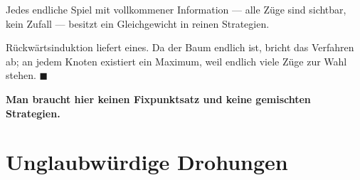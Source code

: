 \begin{merksatz}
Jedes endliche Spiel mit vollkommener Information --- alle Züge sind sichtbar, kein Zufall --- besitzt ein Gleichgewicht in reinen Strategien.

Rückwärtsinduktion liefert eines. Da der Baum endlich ist, bricht das Verfahren ab; an jedem Knoten existiert ein Maximum, weil endlich viele Züge zur Wahl stehen. $\blacksquare$

\begin{center}
\begin{minipage}{0.9\textwidth}
\textbf{Man braucht hier keinen Fixpunktsatz und keine gemischten Strategien.}
\end{minipage}
\end{center}

\begin{center}
\begin{minipage}{0.88\textwidth}
\end{minipage}
\end{center}
\end{merksatz}

\section{Unglaubwürdige Drohungen}

